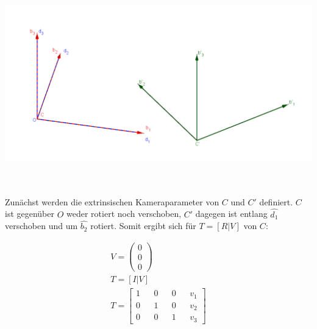 \begin{minipage}{\linewidth}
	\centering
	\includegraphics[width=.52\linewidth]{images/KS_Minimalbeispiel.png}
	\label{fig:KoordsystemeMinimal}
\end{minipage}\\ \\

%

Zunächst werden die extrinsischen Kameraparameter von $C$ und $C'$ definiert. $C$ ist gegenüber $O$ weder rotiert noch verschoben, $C'$ dagegen ist entlang $\hat{d_1}$ verschoben und um $\hat{b_2}$ rotiert. Somit ergibt sich für $T=[R|V]$ von $C$:



\begin{gather}
	V=\begin{pmatrix}
		0\\0\\0
	\end{pmatrix}\\
	T = [I|V]\\
	T = \begin{bmatrix}
		1&&0&&0&&v_1\\
		0&&1&&0&&v_2\\
		0&&0&&1&&v_3
	\end{bmatrix}
\end{gather} 



